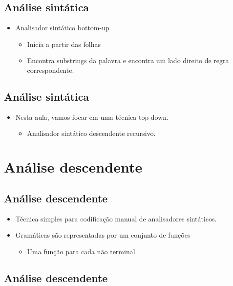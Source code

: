 \documentclass[11pt]{article}
\begin{document}
\subsection*{Análise sintática}
\label{sec:org110b9dc}

\begin{itemize}
\item Analisador sintático bottom-up
\begin{itemize}
\item Inicia a partir das folhas
\item Encontra substrings da palavra e encontra um lado direito de regra correspondente.
\end{itemize}
\end{itemize}
\subsection*{Análise sintática}
\label{sec:org46cfdd5}

\begin{itemize}
\item Nesta aula, vamos focar em uma técnica top-down.
\begin{itemize}
\item Analisador sintático descendente recursivo.
\end{itemize}
\end{itemize}
\section*{Análise descendente}
\label{sec:orgd902801}

\subsection*{Análise descendente}
\label{sec:orga6e913e}

\begin{itemize}
\item Técnica simples para codificação manual de analisadores sintáticos.

\item Gramáticas são representadas por um conjunto de funções
\begin{itemize}
\item Uma função para cada não terminal.
\end{itemize}
\end{itemize}
\subsection*{Análise descendente}
\label{sec:org7aac418}
\end{document}
